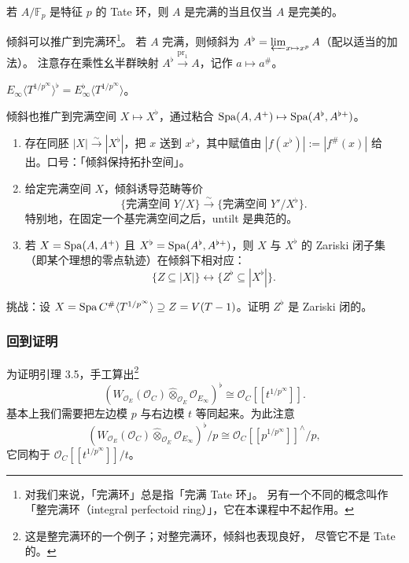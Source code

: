 \begin{example}
若 $A/\mathbb{F}_p$ 是特征 $p$ 的 Tate 环，则 $A$ 是完满的当且仅当 $A$ 是完美的。
\end{example}

倾斜可以推广到完满环\footnote{对我们来说，「完满环」总是指「完满 Tate 环」。
另有一个不同的概念叫作「整完满环（integral perfectoid ring）」，它在本课程中不起作用。}。
若 $A$ 完满，则倾斜为 $A^\flat=\varprojlim_{x\mapsto x^p}A$（配以适当的加法）。
注意存在乘性幺半群映射 $A^\flat\xrightarrow{\mathrm{pr}_1}A$，记作 $a\mapsto a^\#$。

\begin{example}
$E_\infty\langle T^{1/p^\infty}\rangle^\flat=E^\flat_\infty\langle T^{1/p^\infty}\rangle$。
\end{example}

倾斜也推广到完满空间 $X\mapsto X^\flat$，通过粘合 $\operatorname{Spa}(A,A^+)\mapsto\operatorname{Spa}(A^\flat,A^{\flat+})$。

\begin{theorem}[倾斜等价]
\begin{enumerate}[label=(\arabic*), leftmargin=2.6em]
  \item 存在同胚 $|X|\xrightarrow{\sim}|X^\flat|$，把 $x$ 送到 $x^\flat$，其中赋值由
        $|f(x^\flat)|:=|f^\#(x)|$ 给出。口号：「倾斜保持拓扑空间」。
  \item 给定完满空间 $X$，倾斜诱导范畴等价
        \[
        \{\text{完满空间 }Y/X\}\xrightarrow{\sim}\{\text{完满空间 }Y'/X^\flat\}.
        \]
        特别地，在固定一个基完满空间之后，untilt 是典范的。
  \item 若 $X=\operatorname{Spa}(A,A^+)$ 且 $X^\flat=\operatorname{Spa}(A^\flat,A^{\flat+})$，则 $X$ 与 $X^\flat$ 的
        Zariski 闭子集（即某个理想的零点轨迹）在倾斜下相对应：
        \[
        \{Z\subseteq|X|\}\leftrightarrow\{Z^\flat\subseteq|X^\flat|\}.
        \]
\end{enumerate}
\end{theorem}


\begin{example}
挑战：设 $X=\operatorname{Spa} C^\#\langle T^{1/p^\infty}\rangle\supseteq Z=V(T-1)$。证明 $Z^\flat$ 是 Zariski 闭的。
\end{example}

\subsubsection{回到证明}

为证明引理 3.5，手工算出\footnote{这是整完满环的一个例子；对整完满环，倾斜也表现良好，
尽管它不是 Tate 的。}
\[
(W_{\mathcal{O}_E}(\mathcal{O}_C)\widehat{\otimes}_{\mathcal{O}_E}\mathcal{O}_{E_\infty})^\flat
\cong\mathcal{O}_C[[t^{1/p^\infty}]] .
\]
基本上我们需要把左边模 $p$ 与右边模 $t$ 等同起来。为此注意
\[
(W_{\mathcal{O}_E}(\mathcal{O}_C)\widehat{\otimes}_{\mathcal{O}_E}\mathcal{O}_{E_\infty})^\flat/p
\cong\mathcal{O}_C[[p^{1/p^\infty}]]^\wedge/p ,
\]
它同构于 $\mathcal{O}_C[[t^{1/p^\infty}]]/t$。

